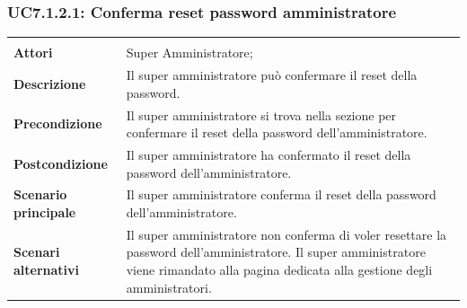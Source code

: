\subsubsection{UC7.1.2.1: Conferma reset password amministratore}
\label{UC7.1.2.1}
\begin{longtable}{l|p{10cm}}
\hline
&\\
\textbf{Attori} & Super Amministratore;\\[7pt]
\textbf{Descrizione} & Il super amministratore può confermare il reset della password.\\[7pt]
\textbf{Precondizione} & Il super amministratore si trova nella sezione per confermare il reset della password dell'amministratore.\\[7pt]
\textbf{Postcondizione} & Il super amministratore ha confermato il reset della password dell'amministratore.\\[7pt]
\textbf{Scenario principale} & Il super amministratore conferma il reset della password dell'amministratore.\\[7pt]
\textbf{Scenari alternativi} & Il super amministratore non conferma di voler resettare la password dell'amministratore. Il super amministratore viene rimandato alla pagina dedicata alla gestione degli amministratori.\\[7pt]\hline
\end{longtable}

